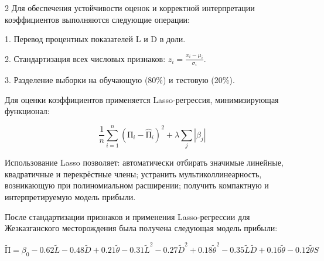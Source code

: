 \begin{multicols}{2}
Для обеспечения устойчивости оценок и корректной интерпретации
коэффициентов выполняются следующие операции:

1. Перевод процентных показателей L и D в доли.

2. Стандартизация всех числовых признаков:
\(z_{i} = \frac{x_{i} - \mu_{i}}{\sigma_{i}}\).

3. Разделение выборки на обучающую (80\%) и тестовую (20\%).

Для оценки коэффициентов применяется Lasso-регрессия, минимизирующая
функционал:

\begin{equation}
\frac{1}{n}\sum_{i = 1}^{n}\left( П_{i} - {\widehat{П}}_{i} \right)^{2} + \lambda\sum_{j}^{}\left| \beta_{j} \right|
\end{equation}

Использование Lasso позволяет: автоматически отбирать значимые линейные,
квадратичные и перекрёстные члены; устранить мультиколлинеарность,
возникающую при полиномиальном расширении; получить компактную и
интерпретируемую модель прибыли.

После стандартизации признаков и применения Lasso-регрессии для
Жезказганского месторождения была получена следующая модель прибыли:
\end{multicols}
\vspace{-0.7cm}
\begin{equation}
\widetilde{П} = \beta_{0} - 0.62\widetilde{L} - 0.48\widetilde{D} + 0.21\widetilde{\theta} - 0.31{\widetilde{L}}^{2} - 0.27{\widetilde{D}}^{2} + 0.18{\widetilde{\theta}}^{2} - 0.35\widetilde{L}\widetilde{D} + 0.16\widetilde{\theta} - 0.12\widetilde{\theta}S
\end{equation}

